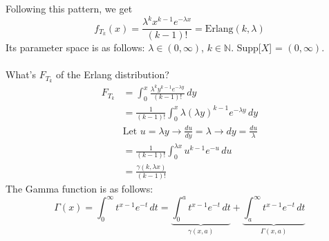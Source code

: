 \documentclass[12pt]{article}
\begin{document}
Following this pattern, we get $$ f_{T_k}(x) = \frac{\lambda^k x^{k - 1} e^{-\lambda x}}{(k - 1)!} = \text{Erlang}(k, \lambda) $$ Its parameter space is as follows: $\lambda \in (0, \infty)$, $k \in \mathbb{N}$. Supp[$X$] = $(0, \infty)$. \\~\\ What's $F_{T_k}$ of the Erlang distribution? $$\begin{aligned} F_{T_k} &= \int_0^x \frac{\lambda^k y^{k - 1} e^{-\lambda y}}{(k - 1)!} \, dy \\ &= \frac{1}{(k - 1)!} \int_0^x \lambda (\lambda y)^{k - 1} e^{-\lambda y} \, dy \\ &\text{Let } u = \lambda y \to \frac{du}{dy} = \lambda \to dy = \frac{du}{\lambda} \\ &= \frac{1}{(k - 1)!} \int_0^{\lambda x} u^{k - 1} e^{-u} \, du \\ &= \frac{\gamma(k, \lambda x)}{(k - 1)!}  \end{aligned} $$ 
The Gamma function is as follows: $$\Gamma(x) = \int_0^{\infty} t^{x - 1} e^{-t} \, dt = \underbrace{\int_0^a t^{x - 1} e^{-t} \, dt}_{\gamma(x, a)} + \underbrace{\int_a^{\infty} t^{x - 1} e^{-t} \, dt}_{\Gamma(x, a)} $$ 
\end{document}
